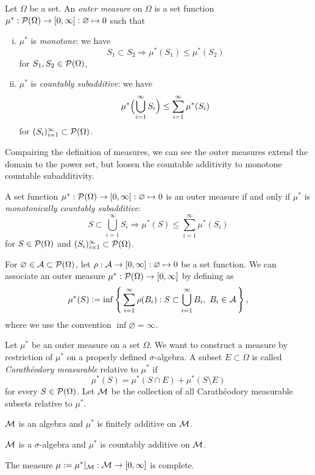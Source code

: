 \documentclass{../note}
\begin{document}
\begin{prb}
Let $\Omega$ be a set.
An \emph{outer measure} on $\Omega$ is a set function $\mu^*:\mathcal{P}(\Omega)\to[0,\infty]:\varnothing\mapsto0$ such that
\begin{enumerate}[(i)]
\item $\mu^*$ is \emph{monotone}: we have
\[S_1\subset S_2\Rightarrow\mu^*(S_1)\le\mu^*(S_2)\]
for $S_1,S_2\in\mathcal{P}(\Omega)$,
\item $\mu^*$ is \emph{countably subadditive}: we have
\[\mu^*\Bigl(\bigcup_{i=1}^\infty S_i\Bigr)\le\sum_{i=1}^\infty\mu^*(S_i)\]
for $(S_i)_{i=1}^\infty\subset\mathcal{P}(\Omega)$.
\end{enumerate}
Compairing the definition of measures, we can see the outer measures extend the domain to the power set, but loosen the countable additivity to monotone countable subadditivity.
\begin{parts}
\item A set function $\mu^*:\mathcal{P}(\Omega)\to[0,\infty]:\varnothing\mapsto0$ is an outer measure if and only if $\mu^*$ is \emph{monotonically countably subadditive}:
\[S\subset\bigcup_{i=1}^\infty S_i\Rightarrow\mu^*(S)\le\sum_{i=1}^\infty\mu^*(S_i)\]
for $S\in\mathcal{P}(\Omega)$ and $(S_i)_{i=1}^\infty\subset\mathcal{P}(\Omega)$.
\item
For $\varnothing\in\mathcal{A}\subset\mathcal{P}(\Omega)$, let $\rho:\mathcal{A}\to[0,\infty]:\varnothing\mapsto0$ be a set function.
We can associate an outer measure $\mu^*:\mathcal{P}(\Omega)\to[0,\infty]$ by defining as
\[\mu^*(S):=\inf\left\{\,\sum_{i=1}^\infty\rho(B_i):S\subset\bigcup_{i=1}^\infty B_i,\ B_i\in\mathcal{A}\,\right\},\]
where we use the convention $\inf\varnothing=\infty$.
\end{parts}
\end{prb}
\begin{pf}

\end{pf}

\begin{prb}
Let $\mu^*$ be an outer measure on a set $\Omega$.
We want to construct a measure by restriction of $\mu^*$ on a properly defined $\sigma$-algebra.
A subset $E\subset\Omega$ is called \emph{Carath\'eodory measurable} relative to $\mu^*$ if
\[\mu^*(S)=\mu^*(S\cap E)+\mu^*(S\setminus E)\]
for every $S\in\mathcal{P}(\Omega)$.
Let $\mathcal{M}$ be the collection of all Carath\'eodory measurable subsets relative to $\mu^*$.
\begin{parts}
\item $\mathcal{M}$ is an algebra and $\mu^*$ is finitely additive on $\mathcal{M}$.
\item $\mathcal{M}$ is a $\sigma$-algebra and $\mu^*$ is countably additive on $\mathcal{M}$.
\item The measure $\mu:=\mu^*|_{\mathcal{M}}:\mathcal{M}\to[0,\infty]$ is complete.
\end{parts}
\end{prb}
\begin{pf}

\end{pf}
\end{document}

